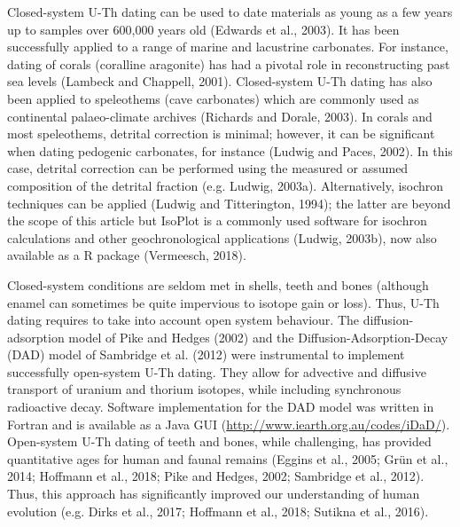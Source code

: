 \documentclass[]{elsarticle} %
\begin{document}
Closed-system U-Th dating can be used to date materials as young as a few years up to samples over 600,000 years old (Edwards et al., 2003). It has been successfully applied to a range of marine and lacustrine carbonates. For instance, dating of corals (coralline aragonite) has had a pivotal role in reconstructing past sea levels (Lambeck and Chappell, 2001). Closed-system U-Th dating has also been applied to speleothems (cave carbonates) which are commonly used as continental palaeo-climate archives (Richards and Dorale, 2003). In corals and most speleothems, detrital correction is minimal; however, it can be significant when dating pedogenic carbonates, for instance (Ludwig and Paces, 2002). In this case, detrital correction can be performed using the measured or assumed composition of the detrital fraction (e.g. Ludwig, 2003a). Alternatively, isochron techniques can be applied (Ludwig and Titterington, 1994); the latter are beyond the scope of this article but IsoPlot is a commonly used software for isochron calculations and other geochronological applications (Ludwig, 2003b), now also available as a R package (Vermeesch, 2018).

Closed-system conditions are seldom met in shells, teeth and bones (although enamel can sometimes be quite impervious to isotope gain or loss). Thus, U-Th dating requires to take into account open system behaviour. The diffusion-adsorption model of Pike and Hedges (2002) and the Diffusion-Adsorption-Decay (DAD) model of Sambridge et al. (2012) were instrumental to implement successfully open-system U-Th dating. They allow for advective and diffusive transport of uranium and thorium isotopes, while including synchronous radioactive decay. Software implementation for the DAD model was written in Fortran and is available as a Java GUI (\url{http://www.iearth.org.au/codes/iDaD/}).\\
Open-system U-Th dating of teeth and bones, while challenging, has provided quantitative ages for human and faunal remains (Eggins et al., 2005; Grün et al., 2014; Hoffmann et al., 2018; Pike and Hedges, 2002; Sambridge et al., 2012). Thus, this approach has significantly improved our understanding of human evolution (e.g. Dirks et al., 2017; Hoffmann et al., 2018; Sutikna et al., 2016).
\end{document}
